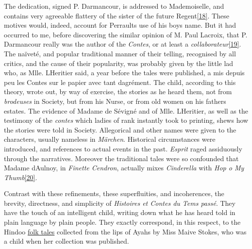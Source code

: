 \documentclass[14pt,a4paper]{memoir}
\newcommand{\ul}[1]{\uline{#1}}
\begin{document}
The dedication, signed P. Darmancour, is addressed to Mademoiselle, and
contains very agreeable flattery of the sister of the future
Regent\protect\hypertarget{4533318093929944247_33931-h-0.htm.xhtmlux5cux23FNanchor_18}{}{}\protect\hyperlink{4533318093929944247_33931-h-0.htm.xhtmlux5cux23Footnote_18}{{[}18{]}}.
These motives would, indeed, account for Perrault\textquotesingle s use
of his boy\textquotesingle s name. But it had occurred to me, before
discovering the similar opinion of M. Paul Lacroix, that P. Darmancour
really was the author of the \emph{Contes}, or at least a
\emph{collaborateur}\protect\hypertarget{4533318093929944247_33931-h-0.htm.xhtmlux5cux23FNanchor_19}{}{}\protect\hyperlink{4533318093929944247_33931-h-0.htm.xhtmlux5cux23Footnote_19}{{[}19{]}}.
The naïveté, and popular traditional manner of their telling, recognised
by all critics, and the cause of their popularity, was probably given by
the little lad who, as Mlle. L\textquotesingle Heritier said, a year
before the tales were published, \textquotesingle a mis depuis peu les
Contes sur le papier avec tant
d\textquotesingle agrément.\textquotesingle{} The child, according to
this theory, wrote out, by way of exercise, the stories as he heard
them, not from \emph{brodeuses} in Society, but from his Nurse, or from
old women on his father\textquotesingle s estates. The evidence of
Madame de Sévigné and of Mlle. L\textquotesingle Heritier, as well as
the testimony of the \emph{contes} which ladies of rank instantly took
to printing, shews how the stories were told in Society. Allegorical and
other names were given to the characters, usually nameless in
\emph{Märchen}. Historical circumstances were introduced, and references
to actual events in the past. \emph{Esprit} raged assiduously through
the narratives. Moreover the traditional tales were so confounded that
Madame d\textquotesingle Aulnoy, in \emph{Finette Cendron}, actually
mixes \emph{Cinderella} with \emph{Hop o\textquotesingle{} My
Thumb}\protect\hypertarget{4533318093929944247_33931-h-0.htm.xhtmlux5cux23FNanchor_20}{}{}\protect\hyperlink{4533318093929944247_33931-h-0.htm.xhtmlux5cux23Footnote_20}{{[}20{]}}.

Contrast with these refinements, these superfluities, and incoherences,
the brevity, directness, and simplicity of \emph{Histoires et Contes du
Tems passé}. They have the touch of an intelligent child, writing down
what he has heard told in plain language by plain people. They exactly
correspond, in this respect, to the Hindoo \ul{folk tales} collected
from the lips of Ayahs by Miss Maive Stokes, who was a child when her
collection was published.
\end{document}
